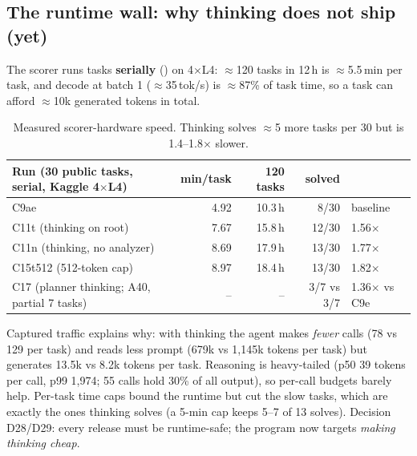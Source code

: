 \subsection{The runtime wall: why thinking does not ship (yet)}
The scorer runs tasks \textbf{serially} () on 4$\times$L4: $\approx$120 tasks in 12\,h is $\approx$5.5\,min per task, and
decode at batch 1 ($\approx$35\,tok/s) is $\approx$87\% of task time, so a task can afford $\approx$10k generated tokens in total.
\begin{table}[H]\centering\small
\begin{tabular}{lrrrl}\toprule
Run (30 public tasks, serial, Kaggle 4$\times$L4) & min/task & 120 tasks & solved & \\\midrule
C9ae & 4.92 & 10.3\,h & 8/30 & baseline \\
C11t (thinking on root) & 7.67 & 15.8\,h & 12/30 & 1.56$\times$ \\
C11n (thinking, no analyzer) & 8.69 & 17.9\,h & 13/30 & 1.77$\times$ \\
C15t512 (512-token cap) & 8.97 & 18.4\,h & 13/30 & 1.82$\times$ \\
C17 (planner thinking; A40, partial 7 tasks) & -- & -- & 3/7 vs 3/7 & 1.36$\times$ vs C9e \\\bottomrule
\end{tabular}\caption{Measured scorer-hardware speed. Thinking solves $\approx$5 more tasks per 30 but is 1.4--1.8$\times$ slower.}\end{table}
Captured traffic explains why: with thinking the agent makes \emph{fewer} calls (78 vs 129 per task) and reads less prompt
(679k vs 1{,}145k tokens per task) but generates 13.5k vs 8.2k tokens per task. Reasoning is heavy-tailed (p50 39 tokens per call,
p99 1{,}974; 55 calls hold 30\% of all output), so per-call budgets barely help. Per-task time caps bound the runtime but cut the
slow tasks, which are exactly the ones thinking solves (a 5-min cap keeps 5--7 of 13 solves). Decision D28/D29: every release must be
runtime-safe; the program now targets \emph{making thinking cheap}.

